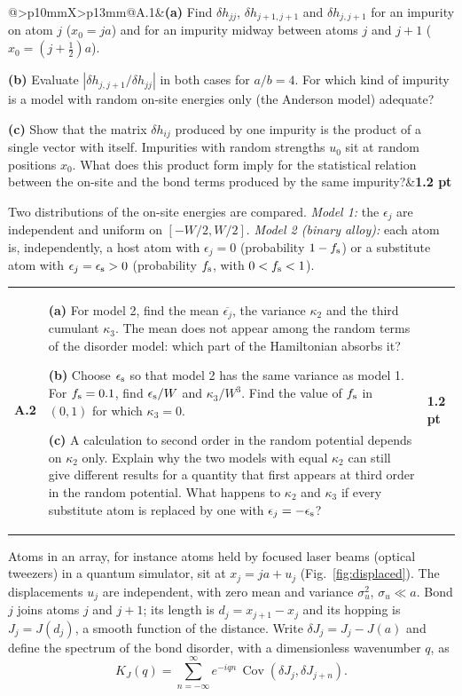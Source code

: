 \documentclass[11pt,a4paper]{article}
\makeatletter
\newcommand{\avg}[1]{\overline{#1}}
\newcommand{\Cov}{\operatorname{Cov}}
\newcommand{\parttitle}[3]{\par\Needspace{8\baselineskip}\vspace{6pt}{\large\bfseries\color{ink}Part #1. #2\hfill\normalsize(#3 points)}\par\vspace{2pt}}
\newcommand{\question}[3]{\begin{tcolorbox}[enhanced,colback=white,colframe=rulegray,boxrule=0.5pt,arc=0pt,left=7pt,right=7pt,top=7pt,bottom=7pt,before skip=9pt,after skip=9pt]\begin{tabularx}{\linewidth}{@{}>{\bfseries}p{10mm}X>{\raggedleft\arraybackslash}p{13mm}@{}}#1&#3&\textbf{#2 pt}\end{tabularx}\end{tcolorbox}}
\makeatother
\begin{document}
\question{A.1}{1.2}{\textbf{(a)} Find $\delta h_{jj}$, $\delta h_{j+1,j+1}$ and $\delta h_{j,j+1}$ for an impurity on atom $j$ ($x_0=ja$) and for an impurity midway between atoms $j$ and $j+1$ ($x_0=(j+\frac12)a$).\par
\textbf{(b)} Evaluate $|\delta h_{j,j+1}/\delta h_{jj}|$ in both cases for $a/b=4$. For which kind of impurity is a model with random on-site energies only (the Anderson model) adequate?\par
\textbf{(c)} Show that the matrix $\delta h_{ij}$ produced by one impurity is the product of a single vector with itself. Impurities with random strengths $u_0$ sit at random positions $x_0$. What does this product form imply for the statistical relation between the on-site and the bond terms produced by the same impurity?}

Two distributions of the on-site energies are compared. \emph{Model 1:} the $\epsilon_j$ are independent and uniform on $[-W/2,W/2]$. \emph{Model 2 (binary alloy):} each atom is, independently, a host atom with $\epsilon_j=0$ (probability $1-f_{\rm s}$) or a substitute atom with $\epsilon_j=\epsilon_{\rm s}>0$ (probability $f_{\rm s}$, with $0<f_{\rm s}<1$).

\question{A.2}{1.2}{\textbf{(a)} For model 2, find the mean $\avg{\epsilon_j}$, the variance $\kappa_2$ and the third cumulant $\kappa_3$. The mean does not appear among the random terms of the disorder model: which part of the Hamiltonian absorbs it?\par
\textbf{(b)} Choose $\epsilon_{\rm s}$ so that model 2 has the same variance as model 1. For $f_{\rm s}=0.1$, find $\epsilon_{\rm s}/W$ and $\kappa_3/W^3$. Find the value of $f_{\rm s}$ in $(0,1)$ for which $\kappa_3=0$.\par
\textbf{(c)} A calculation to second order in the random potential depends on $\kappa_2$ only. Explain why the two models with equal $\kappa_2$ can still give different results for a quantity that first appears at third order in the random potential. What happens to $\kappa_2$ and $\kappa_3$ if every substitute atom is replaced by one with $\epsilon_j=-\epsilon_{\rm s}$?}

\parttitle{B}{Displaced atoms}{2.2}
Atoms in an array, for instance atoms held by focused laser beams (optical tweezers) in a quantum simulator, sit at $x_j=ja+u_j$ (Fig.~\ref{fig:displaced}). The displacements $u_j$ are independent, with zero mean and variance $\sigma_u^2$, $\sigma_u\ll a$. Bond $j$ joins atoms $j$ and $j+1$; its length is $d_j=x_{j+1}-x_j$ and its hopping is $J_j=J(d_j)$, a smooth function of the distance. Write $\delta J_j=J_j-J(a)$ and define the spectrum of the bond disorder, with a dimensionless wavenumber $q$, as
\[
K_J(q)=\sum_{n=-\infty}^{\infty}e^{-iqn}\,\Cov(\delta J_j,\delta J_{j+n}).
\]
\end{document}

